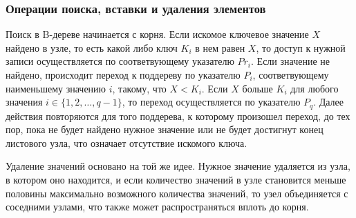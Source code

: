 \subsubsection{Операции поиска, вставки и удаления элементов}

Поиск в B-дереве начинается с корня. Если искомое ключевое значение $X$ найдено
в узле, то есть какой либо ключ $K_i$ в нем равен $X$, то доступ к нужной записи
осуществляется по соответвующему указателю $Pr_i$. Если значение не найдено,
происходит переход к поддереву по указателю $P_i$, соответвующему наименьшему
значению $i$, такому, что $X < K_i$. Если $X$ больше $K_i$ для любого значения
$i \in \{1, 2, \dots, q - 1\}$, то переход осуществляется по указателю $P_q$.
Далее действия повторяются для того поддерева, к которому произошел переход, до
тех пор, пока не будет найдено нужное значение или не будет достигнут конец
листового узла, что означает отсутствие искомого ключа.

Удаление значений основано на той же идее. Нужное значение удаляется из узла, в
котором оно находится, и если количество значений в узле становится меньше
половины максимально возможного количества значений, то узел объединяется с
соседними узлами, что также может распространяться вплоть до корня.

%
%

%
%
%
%
%

